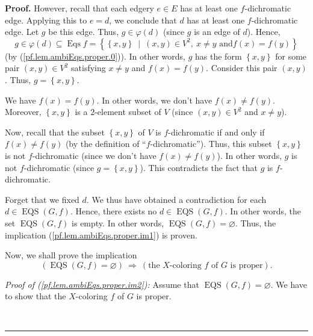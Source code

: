 \documentclass[numbers=enddot,12pt,final,onecolumn,notitlepage]{scrartcl}%
\theoremstyle{definition}
\newenvironment{proof}[1][Proof]{\noindent\textbf{#1.} }{\ \rule{0.5em}{0.5em}}
\newenvironment{verlong}{}{}
\begin{document}
\begin{verlong}
\begin{proof}
However, recall that each edgery $e\in E$ has at least one $f$-dichromatic
edge. Applying this to $e=d$, we conclude that $d$ has at least one
$f$-dichromatic edge. Let $g$ be this edge. Thus, $g\in\varphi\left(
d\right)  $ (since $g$ is an edge of $d$). Hence,%
\[
g\in\varphi\left(  d\right)  \subseteq\operatorname*{Eqs}f=\left\{  \left\{
x,y\right\}  \ \mid\ \left(  x,y\right)  \in V^{2},\ x\neq y\text{ and
}f\left(  x\right)  =f\left(  y\right)  \right\}
\]
(by (\ref{pf.lem.ambiEqs.proper.0})). In other words, $g$ has the form
$\left\{  x,y\right\}  $ for some pair $\left(  x,y\right)  \in V^{2}$
satisfying $x\neq y$ and $f\left(  x\right)  =f\left(  y\right)  $. Consider
this pair $\left(  x,y\right)  $. Thus, $g=\left\{  x,y\right\}  $.

We have $f\left(  x\right)  =f\left(  y\right)  $. In other words, we don't
have $f\left(  x\right)  \neq f\left(  y\right)  $. Moreover, $\left\{
x,y\right\}  $ is a $2$-element subset of $V$ (since $\left(  x,y\right)  \in
V^{2}$ and $x\neq y$).

Now, recall that the subset $\left\{  x,y\right\}  $ of $V$ is $f$-dichromatic
if and only if $f\left(  x\right)  \neq f\left(  y\right)  $ (by the
definition of \textquotedblleft$f$-dichromatic\textquotedblright). Thus, this
subset $\left\{  x,y\right\}  $ is not $f$-dichromatic (since we don't have
$f\left(  x\right)  \neq f\left(  y\right)  $). In other words, $g$ is not
$f$-dichromatic (since $g=\left\{  x,y\right\}  $). This contradicts the fact
that $g$ is $f$-dichromatic.

Forget that we fixed $d$. We thus have obtained a contradiction for each
$d\in\operatorname*{EQS}\left(  G,f\right)  $. Hence, there exists no
$d\in\operatorname*{EQS}\left(  G,f\right)  $. In other words, the set
$\operatorname*{EQS}\left(  G,f\right)  $ is empty. In other words,
$\operatorname*{EQS}\left(  G,f\right)  =\varnothing$. Thus, the implication
(\ref{pf.lem.ambiEqs.proper.im1}) is proven.

Now, we shall prove the implication%
\begin{equation}
\left(  \operatorname*{EQS}\left(  G,f\right)  =\varnothing\right)
\ \Longrightarrow\ \left(  \text{the }X\text{-coloring }f\text{ of }G\text{ is
proper}\right)  . \label{pf.lem.ambiEqs.proper.im2}%
\end{equation}


\textit{Proof of (\ref{pf.lem.ambiEqs.proper.im2}):} Assume that
$\operatorname*{EQS}\left(  G,f\right)  =\varnothing$. We have to show that
the $X$-coloring $f$ of $G$ is proper.


\end{proof}
\end{verlong}
\end{document}

